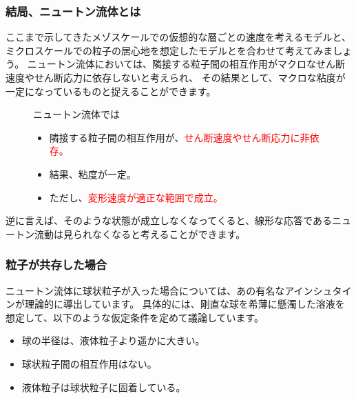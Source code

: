 \documentclass[uplatex,dvipdfmx,a4paper,11pt]{jsarticle}
\begin{document}

\subsubsection{結局、ニュートン流体とは}

ここまで示してきたメゾスケールでの仮想的な層ごとの速度を考えるモデルと、
ミクロスケールでの粒子の居心地を想定したモデルとを合わせて考えてみましょう。
ニュートン流体においては、隣接する粒子間の相互作用がマクロなせん断速度やせん断応力に依存しないと考えられ、
その結果として、マクロな粘度が一定になっているものと捉えることができます。

\begin{figure}[htb]
	\begin{center}
		\begin{minipage}{0.9\textwidth}
			\begin{itembox}[l]{ニュートン流体では}
				\begin{itemize}
					\item 隣接する粒子間の相互作用が、\textcolor{red}{せん断速度やせん断応力に非依存。}
					\item 結果、粘度が一定。
					\item ただし、\textcolor{red}{変形速度が適正な範囲で成立。}
				\end{itemize}
			\end{itembox}
		\end{minipage}
	\end{center}
\end{figure}

逆に言えば、そのような状態が成立しなくなってくると、線形な応答であるニュートン流動は見られなくなると考えることができます。

\subsubsection{粒子が共存した場合}

ニュートン流体に球状粒子が入った場合については、あの有名なアインシュタインが理論的に導出しています。
具体的には、剛直な球を希薄に懸濁した溶液を想定して、以下のような仮定条件を定めて議論しています。
\begin{itemize}
	\item 球の半径は、液体粒子より遥かに大きい。
	\item 球状粒子間の相互作用はない。
	\item 液体粒子は球状粒子に固着している。
\end{itemize}
\end{document}
